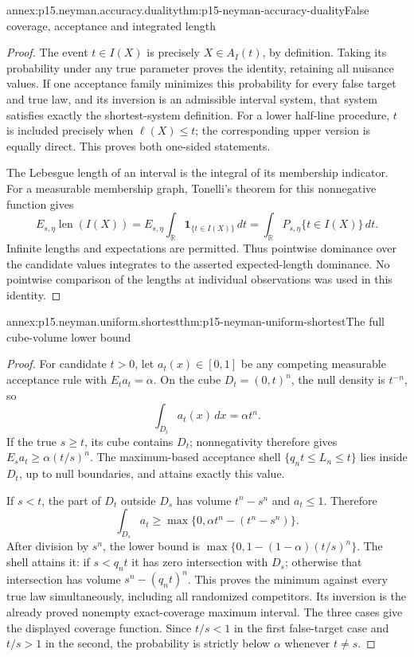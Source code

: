 \begin{annexitem}{annex:p15.neyman.accuracy.duality}{thm:p15-neyman-accuracy-duality}{False coverage, acceptance and integrated length}
\begin{proof}
The event \(t\in I(X)\) is precisely
\(X\in A_I(t)\), by definition.
Taking its probability under any true
parameter proves the identity, retaining
all nuisance values. If one acceptance
family minimizes this probability for
every false target and true law, and
its inversion is an admissible interval
system, that system satisfies exactly
the shortest-system definition.
For a lower half-line procedure,
\(t\) is included precisely when
\(\ell(X)\leq t\); the corresponding
upper version is equally direct.
This proves both one-sided statements.

The Lebesgue length of an interval is
the integral of its membership indicator.
For a measurable membership graph,
Tonelli's theorem for this nonnegative
function gives
\[
 E_{s,\eta}\operatorname{len}(I(X))
   =E_{s,\eta}\int_{\mathbb R}\mathbf1_{\{t\in I(X)\}}\,dt
   =\int_{\mathbb R}P_{s,\eta}\{t\in I(X)\}\,dt.
\]
Infinite lengths and expectations are
permitted. Thus pointwise dominance
over the candidate values integrates
to the asserted expected-length
dominance. No pointwise comparison
of the lengths at individual observations
was used in this identity.
\end{proof}
\end{annexitem}

\begin{annexitem}{annex:p15.neyman.uniform.shortest}{thm:p15-neyman-uniform-shortest}{The full cube-volume lower bound}
\begin{proof}
For candidate \(t>0\), let \(a_t(x)\in[0,1]\)
be any competing measurable acceptance rule
with \(E_t a_t=\alpha\).
On the cube \(D_t=(0,t)^n\), the
null density is \(t^{-n}\), so
\[
                             \int_{D_t}a_t(x)\,dx=\alpha t^n.
\]
If the true \(s\geq t\), its cube
contains \(D_t\); nonnegativity therefore
gives \(E_s a_t\geq\alpha(t/s)^n\).
The maximum-based acceptance shell
\(\{q_nt\leq L_n\leq t\}\) lies
inside \(D_t\), up to null boundaries,
and attains exactly this value.

If \(s<t\), the part of \(D_t\)
outside \(D_s\) has volume \(t^n-s^n\)
and \(a_t\leq1\). Therefore
\[
 \int_{D_s}a_t
     \geq \max\{0,\alpha t^n-(t^n-s^n)\}.
\]
After division by \(s^n\), the lower
bound is
\(\max\{0,1-(1-\alpha)(t/s)^n\}\).
The shell attains it: if \(s<q_nt\)
it has zero intersection with \(D_s\);
otherwise that intersection has
volume \(s^n-(q_nt)^n\).
This proves the minimum against every
true law simultaneously, including
all randomized competitors.
Its inversion is the already proved
nonempty exact-coverage maximum interval.
The three cases give the displayed
coverage function. Since \(t/s<1\)
in the first false-target case and
\(t/s>1\) in the second, the
probability is strictly below
\(\alpha\) whenever \(t\ne s\).
\end{proof}
\end{annexitem}

